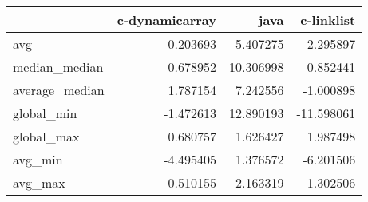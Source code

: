 \begin{tabular}{lrrr}
\toprule
{} &  c-dynamicarray &       java &  c-linklist \\
\midrule
avg            &       -0.203693 &   5.407275 &   -2.295897 \\
median\_median  &        0.678952 &  10.306998 &   -0.852441 \\
average\_median &        1.787154 &   7.242556 &   -1.000898 \\
global\_min     &       -1.472613 &  12.890193 &  -11.598061 \\
global\_max     &        0.680757 &   1.626427 &    1.987498 \\
avg\_min        &       -4.495405 &   1.376572 &   -6.201506 \\
avg\_max        &        0.510155 &   2.163319 &    1.302506 \\
\bottomrule
\end{tabular}
